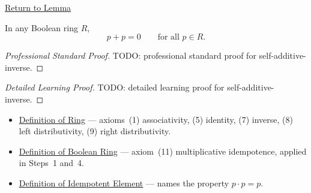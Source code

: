 
\newpage
{}
\label{prf:self-additive-inverse}

\begin{remark*}[Return]
\hyperref[lem:self-additive-inverse]{Return to Lemma}

\end{remark*}

\begin{lemma*}
In any Boolean ring $R$,
\[
p + p = 0 \qquad \text{for all } p \in R.
\]
\end{lemma*}

\begin{proof}[Professional Standard Proof]
\LRAProofBodyStart
TODO: professional standard proof for self-additive-inverse.
\end{proof}

\begin{proof}[Detailed Learning Proof]
\LRAProofBodyStart
TODO: detailed learning proof for self-additive-inverse.
\end{proof}

\begin{remark*}
\end{remark*}

\begin{dependencies}
\begin{itemize}
  \item \hyperref[def:algebraic-ring]{Definition of Ring}
        --- axioms~(1) associativity, (5) identity, (7) inverse,
        (8) left distributivity, (9) right distributivity.
  \item \hyperref[def:boolean-ring]{Definition of Boolean Ring}
        --- axiom~(11) multiplicative idempotence,
        applied in Steps~1 and~4.
  \item \hyperref[def:idempotent-element]{Definition of Idempotent Element}
        --- names the property $p \cdot p = p$.
\end{itemize}
\end{dependencies}

\clearpage
